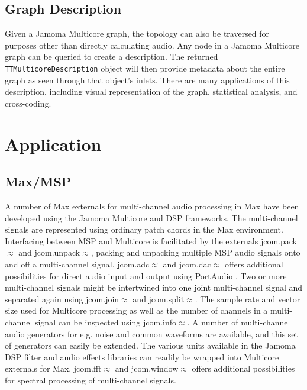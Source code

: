 \documentclass[twoside,a4paper]{article}
\begin{document}


\subsection{Graph Description} %

Given a Jamoma Multicore graph, the topology can also be traversed for purposes other than directly calculating audio.  
Any node in a Jamoma Multicore graph can be queried to create a description.  The returned \texttt{TTMulticoreDescription} object will then provide metadata about the entire graph as seen through that object's inlets.  
There are many applications of this description, including visual representation of the graph, statistical analysis, and cross-coding.







\section{Application} %

\subsection{Max/MSP} %


A number of Max externals for multi-channel audio processing in Max have been developed using the Jamoma Multicore and DSP frameworks. 
The multi-channel signals are represented using ordinary patch chords in the Max environment. 
Interfacing between MSP and Multicore is facilitated by the externals jcom.pack$\approx$ and jcom.unpack$\approx$, packing and unpacking multiple MSP audio signals onto and off a multi-channel signal. 
jcom.adc$\approx$ and jcom.dac$\approx$ offers additional possibilities for direct audio input and output using PortAudio \cite{Bencina:2003}. 
Two or more multi-channel signals might be intertwined into one joint multi-channel signal and separated again using jcom.join$\approx$ and jcom.split$\approx$.
The sample rate and vector size used for Multicore processing as well as the number of channels in a multi-channel signal can be inspected using jcom.info$\approx$.
A number of multi-channel audio generators for e.g. noise and common waveforms are available, and this set of generators can easily be extended.
The various units available in the Jamoma DSP filter and audio effects libraries can readily be wrapped into Multicore externals for Max.
jcom.fft$\approx$ and jcom.window$\approx$ offers additional possibilities for spectral processing of multi-channel signals.
\end{document}
